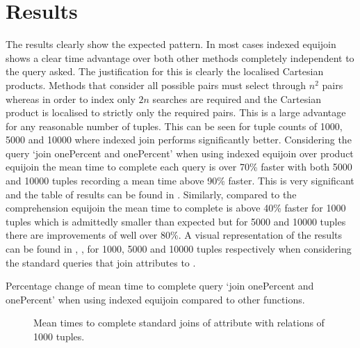 \section{Results}
The results clearly show the expected pattern. In most cases indexed equijoin
shows a clear time advantage over both other methods completely independent to
the query asked. The justification for this is clearly the localised Cartesian
products. Methods that consider all possible pairs must select through $n^2$
pairs whereas in order to index only $2n$ searches are required and the
Cartesian product is localised to strictly only the required pairs. This is a
large advantage for any reasonable number of tuples. This can be seen for tuple
counts of 1000, 5000 and 10000 where indexed join performs significantly better.
Considering the query `join onePercent and onePercent' when using indexed
equijoin over product equijoin the mean time to complete each query is over 70\% faster
with both 5000 and 10000 tuples recording a mean time above 90\% faster. This
is very significant and the table of results can be found in
. Similarly, compared to the comprehension
equijoin the mean time to complete is above 40\% faster for 1000 tuples which is
admittedly smaller than expected but for 5000 and 10000 tuples there are
improvements of well over 80\%. A visual representation of the results can be
found in ,
,
 for 1000, 5000 and 10000 tuples
respectively when considering the standard queries that join attributes to
.

\begin{table}[b]
    \centering
    
    \caption{Percentage change of mean time to complete query `join onePercent
        and onePercent' when using indexed equijoin compared to other
    functions.}
    \label{tab:percentage-change-of-means-join-onePercent-and-onePercent}
\end{table}

\begin{figure}[p]
    \centering
    
    \caption{Mean times to complete standard joins of
     attribute with relations of 1000 tuples.}
    \label{fig:benchmark:onePercent-1000}
\end{figure}

